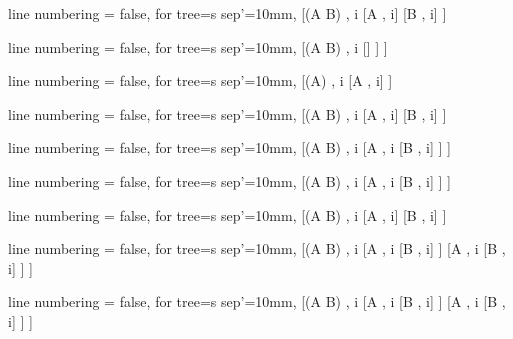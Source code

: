 \documentclass[12pt, fleqn]{article}
\begin{document}
\begin{multicols}{3}
\begin{tableau}
  { line numbering = false,
  for tree={s sep'=10mm},
  }
[(A \supset B) {,} i
	[\neg A {,} i]
	[B {,} i]
]
\end{tableau}

\vspace{1cm}
\begin{tableau}
  { line numbering = false,
  for tree={s sep'=10mm},
  }
[\neg (A \supset B) {,} i
	[\downarrow 
		[A {,} i
			[\neg B {,} i]
		]
	]
]
\end{tableau}

\vspace{1cm}
\begin{tableau}
  { line numbering = false,
  for tree={s sep'=10mm},
  }
[(\neg \neg A) {,} i
	[A {,} i]
]
\end{tableau}

\vspace{1cm}
\begin{tableau}
  { line numbering = false,
  for tree={s sep'=10mm},
  }
[(A \vee B) {,} i
	[A {,} i]
	[B {,} i]
]
\end{tableau}

\vspace{1cm}
\begin{tableau}
  { line numbering = false,
  for tree={s sep'=10mm},
  }
[\neg(A \vee B) {,} i
	[\neg A {,} i
		[\neg B {,} i]
	]
]
\end{tableau}


\vspace{1cm}
\begin{tableau}
  { line numbering = false,
  for tree={s sep'=10mm},
  }
[(A \wedge B) {,} i
	[A {,} i
		[B {,} i]
	]
]
\end{tableau}


\vspace{1cm}
\begin{tableau}
  { line numbering = false,
  for tree={s sep'=10mm},
  }
[\neg(A \wedge B) {,} i
	[\neg A {,} i]
	[\neg B {,} i]
]
\end{tableau}

\vspace{1cm}


\begin{tableau}
  { line numbering = false,
  for tree={s sep'=10mm},
  }
[(A \equiv B) {,} i
	[A {,} i
		[B {,} i]
	]
	[\neg A {,} i
		[\neg B {,} i]
	]
]
\end{tableau}


\vspace{1cm}
\begin{tableau}
  { line numbering = false,
  for tree={s sep'=10mm},
  }
[\neg(A \equiv B) {,} i
	[\neg A {,} i
		[B {,} i]
	]
	[A {,} i
		[\neg B {,} i]
	]
]
\end{tableau}




\end{multicols}
\end{document}
